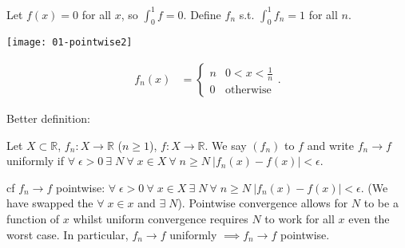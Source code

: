 \begin{example}
Let $f(x) = 0$ for all $x$, so $\int_0^1 f = 0$.
Define $f_n$ s.t. $\int_0^1 f_n = 1$ for all $n$.
{\par
    \centering 
    \texttt{[image: 01-pointwise2]} 
\par}
\begin{align*}
    f_n(x) &= \begin{cases}
        n & 0 < x < \frac{1}{n} \\
        0 & \text{otherwise}
    \end{cases}.
\end{align*} 
\end{example} 

Better definition:
\begin{definition}
    Let $X \subset \mathbb{R}$, $f_n : X \to \mathbb{R}$ ($n \geq 1$), $f: X \to \mathbb{R}$.
    We say $(f_n)$  to $f$ and write $f_n \to f$ uniformly if $\forall \; \epsilon > 0 \ \exists \; N \ \forall \; x \in X \ \forall \; n \geq N \ |f_n(x) - f(x)| < \epsilon$.
\end{definition} 

cf $f_n \to f$ pointwise: $\forall \; \epsilon > 0 \ \forall \; x \in X \ \exists \; N \ \forall \; n \geq N \ |f_n(x) - f(x)| < \epsilon$. (We have swapped the $\forall \; x \in x$ and $\exists \; N$).
Pointwise convergence allows for $N$ to be a function of $x$ whilst uniform convergence requires $N$ to work for all $x$ even the worst case.
In particular, $f_n \to f$ uniformly $\implies f_n \to f$ pointwise.

